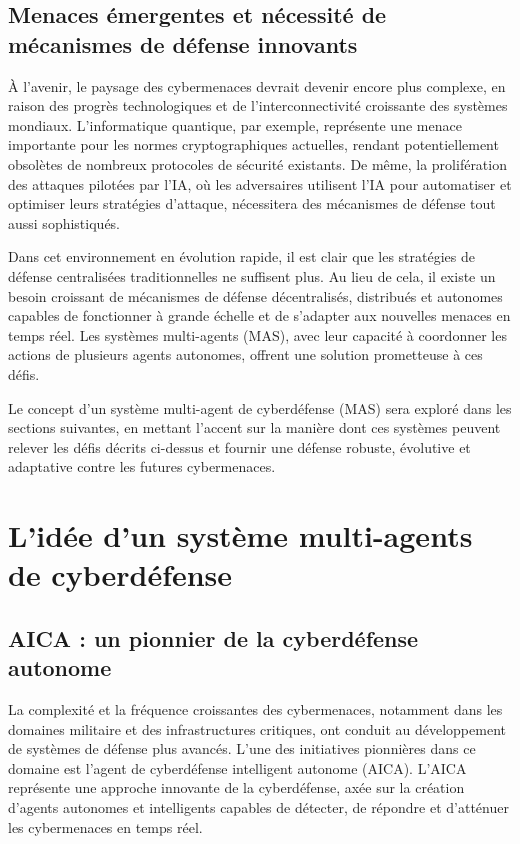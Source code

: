 \subsection{Menaces émergentes et nécessité de mécanismes de défense innovants}

À l’avenir, le paysage des cybermenaces devrait devenir encore plus complexe, en raison des progrès technologiques et de l’interconnectivité croissante des systèmes mondiaux. L’informatique quantique, par exemple, représente une menace importante pour les normes cryptographiques actuelles, rendant potentiellement obsolètes de nombreux protocoles de sécurité existants\cite{mosca2018cybersecurity}\cite{bernstein2017post}. De même, la prolifération des attaques pilotées par l’IA, où les adversaires utilisent l’IA pour automatiser et optimiser leurs stratégies d’attaque, nécessitera des mécanismes de défense tout aussi sophistiqués\cite{brundage2018malicious}.

Dans cet environnement en évolution rapide, il est clair que les stratégies de défense centralisées traditionnelles ne suffisent plus. Au lieu de cela, il existe un besoin croissant de mécanismes de défense décentralisés, distribués et autonomes capables de fonctionner à grande échelle et de s'adapter aux nouvelles menaces en temps réel. Les systèmes multi-agents (MAS), avec leur capacité à coordonner les actions de plusieurs agents autonomes, offrent une solution prometteuse à ces défis.

Le concept d'un système multi-agent de cyberdéfense (MAS) sera exploré dans les sections suivantes, en mettant l'accent sur la manière dont ces systèmes peuvent relever les défis décrits ci-dessus et fournir une défense robuste, évolutive et adaptative contre les futures cybermenaces.


\section{L'idée d'un système multi-agents de cyberdéfense}

\subsection{AICA : un pionnier de la cyberdéfense autonome}

La complexité et la fréquence croissantes des cybermenaces, notamment dans les domaines militaire et des infrastructures critiques, ont conduit au développement de systèmes de défense plus avancés. L'une des initiatives pionnières dans ce domaine est l'agent de cyberdéfense intelligent autonome (AICA). L'AICA représente une approche innovante de la cyberdéfense, axée sur la création d'agents autonomes et intelligents capables de détecter, de répondre et d'atténuer les cybermenaces en temps réel.

